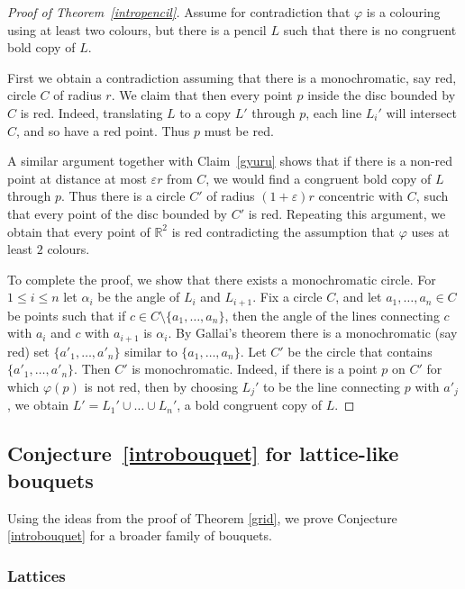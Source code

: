 \documentclass[12pt]{article}
\theoremstyle{plain}
\theoremstyle{definition}
\begin{document}
\begin{proof}[Proof of Theorem~\ref{intropencil}]
Assume for contradiction that $\varphi$ is a colouring using at least two colours, but there is a pencil $L$ such that there is no congruent bold copy of $L$.

First we obtain a contradiction assuming that there is a monochromatic, say red, circle $C$ of radius $r$. We claim that then every point $p$ inside the disc bounded by $C$ is red. Indeed, translating $L$ to a copy $L'$ through $p$, each line $L_i'$ will intersect $C$, and so have a red point. Thus $p$ must be red.

A similar argument together with Claim~\ref{gyuru} shows that if there is a non-red point at distance at most $\varepsilon r$ from $C$, we would find a congruent bold copy of $L$ through $p$. Thus there is a circle $C'$ of radius $(1+\varepsilon)r$ concentric with $C$, such that every point of the disc bounded by $C'$ is red. Repeating this argument, we obtain that every point of $\mathbb{R}^2$ is red contradicting the assumption that $\varphi$ uses at least $2$ colours. 

To complete the proof, we show that there exists a monochromatic circle. For $1\leq i\leq n$ let $\alpha_i$ be the angle of $L_i$ and $L_{i+1}$. Fix a circle $C$, and let $a_1,\dots,a_n\in C$ be points such that if $c\in C\setminus \{a_1, \ldots, a_n\}$, then the angle of the lines connecting $c$ with $a_i$ and $c$ with $a_{i+1}$ is $\alpha_i$. By Gallai's theorem there is a monochromatic (say red) set $\{a'_1,\dots,a'_n\}$ similar to $\{a_1,\dots,a_n\}$. Let $C'$ be the circle that contains $\{a'_1,\dots,a'_n\}$. Then $C'$ is monochromatic. Indeed, if there is a point $p$ on $C'$ for which $\varphi(p)$ is not red, then by choosing $L_j'$ to be the line connecting $p$ with $a'_j$, we obtain $L'=L_1'\cup\dots\cup L_n'$, a bold congruent copy of $L$. 
\end{proof}

\subsection{Conjecture~\ref{introbouquet} for lattice-like bouquets}\label{42}

Using the ideas from the proof of Theorem \ref{grid}, we prove Conjecture \ref{introbouquet} for a broader family of bouquets.

\subsubsection{Lattices}
\end{document}
